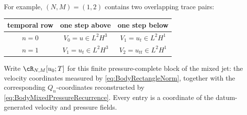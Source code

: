 For example, \((N,M)=(1,2)\) contains two overlapping trace pairs:
\begin{center}
\captionsetup{hypcap=false}
\label{tab:FirstAdjacentRectangle}
\renewcommand{\arraystretch}{1.35}
\begin{tabular}{@{}c c c@{}}
\toprule
temporal row & one step above & one step below \\
\midrule
\(n=0\) & \(V_0=u\in L^2H^3\) & \(V_1=u_t\in L^2H^1\) \\
\(n=1\) & \(V_1=u_t\in L^2H^3\) & \(V_2=u_{tt}\in L^2H^1\) \\
\bottomrule
\end{tabular}
\end{center}

Write \(\cR_{N,M}[u_0;T]\) for this finite pressure-complete block of the mixed jet:
the velocity coordinates measured by \eqref{eq:BodyRectangleNorm}, together with the
corresponding \(Q_n\)-coordinates reconstructed by
\eqref{eq:BodyMixedPressureRecurrence}.  Every entry is a coordinate of the
datum-generated velocity and pressure fields.


